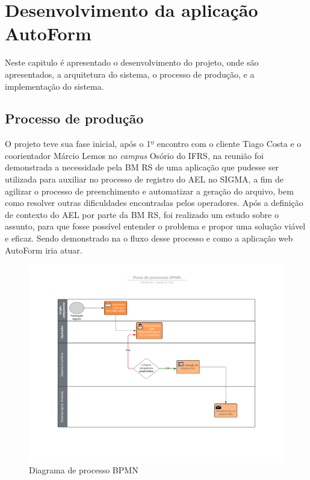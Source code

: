 \chapter{Desenvolvimento da aplicação AutoForm}
Neste capitulo é apresentado o desenvolvimento do projeto, onde são apresentados, a arquitetura do sistema, o processo de produção, e a implementação do sistema.

\section{Processo de produção}
O projeto teve sua fase inicial, após o 1º encontro com o cliente Tiago Costa e o coorientador Márcio Lemos no \textit{campus} Osório do IFRS, na reunião foi demonstrada a necessidade pela BM RS de uma aplicação que pudesse ser utilizada para auxiliar no processo de registro do AEL no SIGMA, a fim de agilizar o processo de preenchimento e automatizar a geração do arquivo, bem como resolver outras dificuldades encontradas pelos operadores.
Após a definição de contexto do AEL por parte da BM RS, foi realizado um estudo sobre o assunto, para que fosse possível entender o problema e propor uma solução viável e eficaz.
Sendo demonstrado na  o fluxo desse processo e como a aplicação web AutoForm iria atuar.

\begin{figure}[htb]
    \caption{\label{fig:diagramaBPMN}Diagrama de processo BPMN}
    \begin{center}
        \includegraphics[scale=0.6]{imagens/FluxodeprocessoBPMN.jpeg}
    \end{center}
\end{figure}

